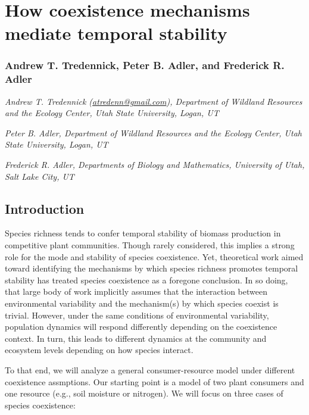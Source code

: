 \documentclass[12pt,]{article}
\author{}
\date{}
\begin{document}
\normalsize


\section{How coexistence mechanisms mediate temporal
stability}\label{how-coexistence-mechanisms-mediate-temporal-stability}

\subsubsection{Andrew T. Tredennick, Peter B. Adler, and Frederick R.
Adler}\label{andrew-t.-tredennick-peter-b.-adler-and-frederick-r.-adler}

\emph{Andrew T. Tredennick
(\href{mailto:atredenn@gmail.com}{\href{mailto:atredenn@gmail.com}{atredenn@gmail.com}}),
Department of Wildland Resources and the Ecology Center, Utah State
University, Logan, UT}

\emph{Peter B. Adler, Department of Wildland Resources and the Ecology
Center, Utah State University, Logan, UT}

\emph{Frederick R. Adler, Departments of Biology and Mathematics,
University of Utah, Salt Lake City, UT}

\subsection{Introduction}\label{introduction}

Species richness tends to confer temporal stability of biomass
production in competitive plant communities. Though rarely considered,
this implies a strong role for the mode and stability of species
coexistence. Yet, theoretical work aimed toward identifying the
mechanisms by which species richness promotes temporal stability has
treated species coexistence as a foregone conclusion. In so doing, that
large body of work implicitly assumes that the interaction between
environmental variability and the mechanism(s) by which species coexist
is trivial. However, under the same conditions of environmental
variability, population dynamics will respond differently depending on
the coexistence context. In turn, this leads to different dynamics at
the community and ecosystem levels depending on how species interact.

To that end, we will analyze a general consumer-resource model under
different coexistence assmptions. Our starting point is a model of two
plant consumers and one resource (e.g., soil moisture or nitrogen). We
will focus on three cases of species coexistence:
\end{document}

